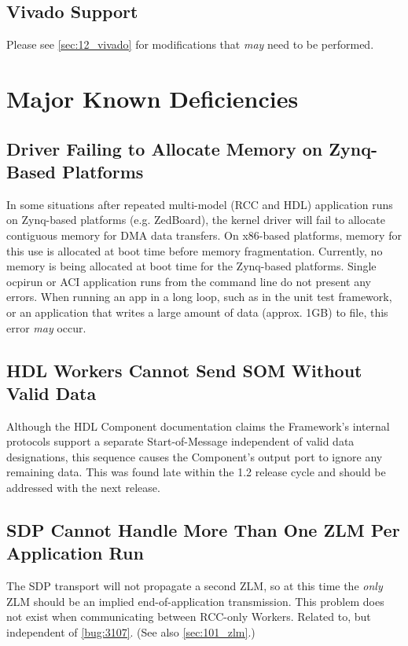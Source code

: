 \subsection{Vivado Support}
Please see \ref{sec:12_vivado} for modifications that \textit{may} need to be performed.

\section{Major Known Deficiencies}
\subsection{Driver Failing to Allocate Memory on Zynq-Based Platforms} %
\label{bug:1645}
In some situations after repeated multi-model (RCC and HDL) application runs on Zynq-based platforms (e.g. ZedBoard), the kernel driver will fail to allocate contiguous memory for DMA data transfers. On x86-based platforms, memory for this use is allocated at boot time before memory fragmentation. Currently, no memory is being allocated at boot time for the Zynq-based platforms. Single ocpirun or ACI application runs from the command line do not present any errors. When running an app in a long loop, such as in the unit test framework, or an application that writes a large amount of data (approx. 1GB) to file, this error \textit{may} occur.

\subsection{HDL Workers Cannot Send SOM Without Valid Data} %
\label{bug:3099}
Although the HDL Component documentation claims the Framework's internal protocols support a separate Start-of-Message independent of valid data designations, this sequence causes the Component's output port to ignore any remaining data. This was found late within the 1.2 release cycle and should be addressed with the next release.

\subsection{SDP Cannot Handle More Than One ZLM Per Application Run} %
\label{bug:3109}
The SDP transport will not propagate a second ZLM, so at this time the \textit{only} ZLM should be an implied end-of-application transmission. This problem does not exist when communicating between RCC-only Workers. Related to, but independent of \ref{bug:3107}. (See also \ref{sec:101_zlm}.)

